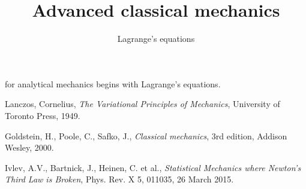 \documentclass[english,seminar,headertitle]{lecture}
\title{Advanced classical mechanics}
\subtitle{Lagrange's equations}
\author{}
\date{}{}{}
\begin{document}
%
\newcommand{\act}{S[\mathbf{r}]}
\newcommand{\dt}{\textrm{d}t\;}
\renewcommand{\th}[1]{#1$^\textrm{th}$}
%
\noindent{} for analytical mechanics begins with Lagrange's equations.

%
\begin{thebibliography}{1}
	Lanczos, Cornelius, \textit{The Variational Principles of Mechanics}, University of Toronto Press, 1949.
	
	Goldstein, H., Poole, C., Safko, J., \textit{Classical mechanics}, 3rd edition, Addison Wesley, 2000.
	
	Ivlev, A.V., Bartnick, J., Heinen, C. et al., \textit{Statistical Mechanics where Newton's Third Law is Broken}, Phys. Rev. X 5, 011035, 26 March 2015.
\end{thebibliography}
\end{document}
